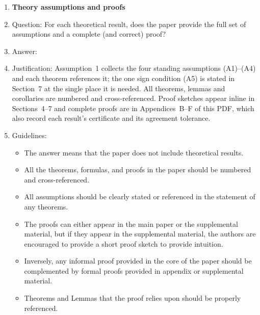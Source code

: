 \begin{enumerate}
\begin{itemize}
        \item While the authors might fear that complete honesty about limitations might be used by reviewers as grounds for rejection, a worse outcome might be that reviewers discover limitations that aren't acknowledged in the paper. The authors should use their best judgment and recognize that individual actions in favor of transparency play an important role in developing norms that preserve the integrity of the community. Reviewers will be specifically instructed to not penalize honesty concerning limitations.
    \end{itemize}

\item {\bf Theory assumptions and proofs}
    \item[] Question: For each theoretical result, does the paper provide the full set of assumptions and a complete (and correct) proof?
    \item[] Answer: \answerYes{}
    \item[] Justification: Assumption~1 collects the four standing assumptions (A1)--(A4) and each theorem references it; the one sign condition (A5) is stated in Section~7 at the single place it is needed. All theorems, lemmas and corollaries are numbered and cross-referenced. Proof sketches appear inline in Sections~4--7 and complete proofs are in Appendices~B--F of this PDF, which also record each result's certificate and its agreement tolerance.
    \item[] Guidelines:
    \begin{itemize}
        \item The answer \answerNA{} means that the paper does not include theoretical results. 
        \item All the theorems, formulas, and proofs in the paper should be numbered and cross-referenced.
        \item All assumptions should be clearly stated or referenced in the statement of any theorems.
        \item The proofs can either appear in the main paper or the supplemental material, but if they appear in the supplemental material, the authors are encouraged to provide a short proof sketch to provide intuition. 
        \item Inversely, any informal proof provided in the core of the paper should be complemented by formal proofs provided in appendix or supplemental material.
        \item Theorems and Lemmas that the proof relies upon should be properly referenced. 
    \end{itemize}


\end{enumerate}
